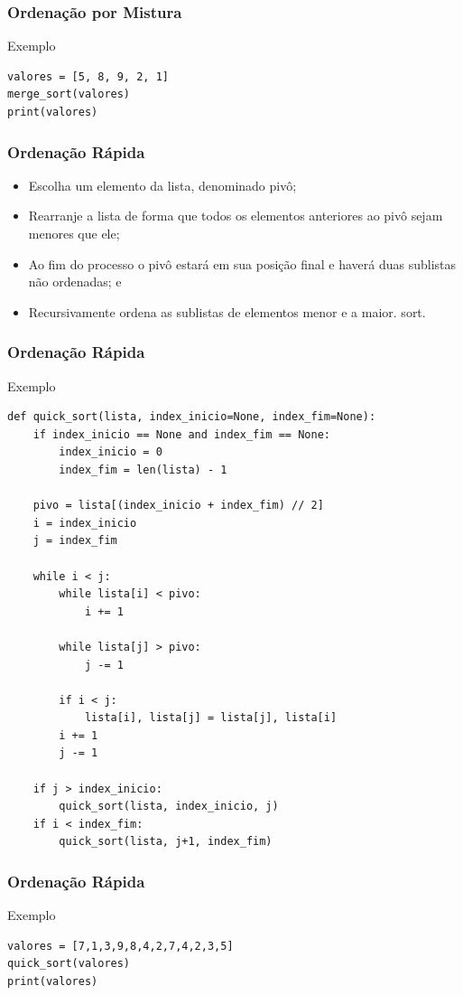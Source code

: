 \documentclass{beamer}
\begin{document}
\begin{frame}[fragile]
\frametitle{Ordenação por Mistura}

\begin{exampleblock}{Exemplo}
	\begin{lstlisting}
valores = [5, 8, 9, 2, 1]
merge_sort(valores)
print(valores)
	\end{lstlisting}
\end{exampleblock}
\end{frame}

\begin{frame}
\frametitle{Ordenação Rápida}

\begin{itemize}
	\item Escolha um elemento da lista, denominado pivô;
	\item Rearranje a lista de forma que todos os elementos anteriores ao pivô
	sejam menores que ele;
	\item Ao fim do processo o pivô estará em sua posição final e haverá duas
	sublistas não ordenadas; e
	\item Recursivamente ordena as sublistas de elementos menor e a maior.
	sort.
\end{itemize}
\end{frame}

\begin{frame}[fragile]
\frametitle{Ordenação Rápida}

\begin{exampleblock}{Exemplo}
	\begin{lstlisting}
def quick_sort(lista, index_inicio=None, index_fim=None):
    if index_inicio == None and index_fim == None:
        index_inicio = 0
        index_fim = len(lista) - 1

    pivo = lista[(index_inicio + index_fim) // 2]
    i = index_inicio
    j = index_fim

    while i < j:
        while lista[i] < pivo:
            i += 1

        while lista[j] > pivo:
            j -= 1

        if i < j:    
            lista[i], lista[j] = lista[j], lista[i]
        i += 1
        j -= 1

    if j > index_inicio:
        quick_sort(lista, index_inicio, j)
    if i < index_fim:
        quick_sort(lista, j+1, index_fim)
	\end{lstlisting}
\end{exampleblock}
\end{frame}

\begin{frame}[fragile]
\frametitle{Ordenação Rápida}

\begin{exampleblock}{Exemplo}
	\begin{lstlisting}
valores = [7,1,3,9,8,4,2,7,4,2,3,5]
quick_sort(valores)
print(valores)
	\end{lstlisting}
\end{exampleblock}
\end{frame}
\end{document}
